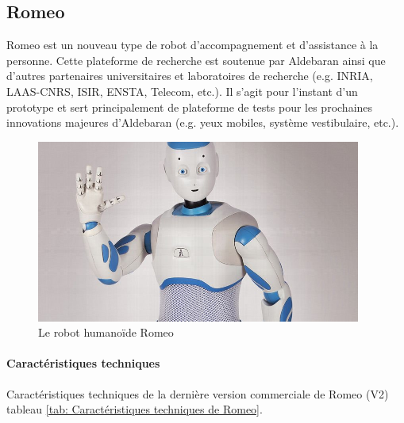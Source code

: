 \subsection{Romeo}
\label{Entreprise: Les produits: Romeo}
Romeo est un nouveau type de robot d'accompagnement et d'assistance à la personne. Cette plateforme de recherche est soutenue par Aldebaran ainsi que d'autres partenaires universitaires et laboratoires de recherche (e.g. INRIA, LAAS-CNRS, ISIR, ENSTA, Telecom, etc.). Il s'agit pour l'instant d'un prototype et sert principalement de plateforme de tests pour les prochaines innovations majeures d'Aldebaran (e.g. yeux mobiles, système vestibulaire, etc.).

\begin{figure}[H]
	\centering\includegraphics[height=6cm]{images/romeo.jpg}
	\caption{Le robot humanoïde Romeo}
	\label{fig:Robot humanoïde Romeo}
\end{figure}

\paragraph{Caractéristiques techniques}
Caractéristiques techniques de la dernière version commerciale de Romeo (V2) tableau \ref{tab: Caractéristiques techniques de Romeo}.

